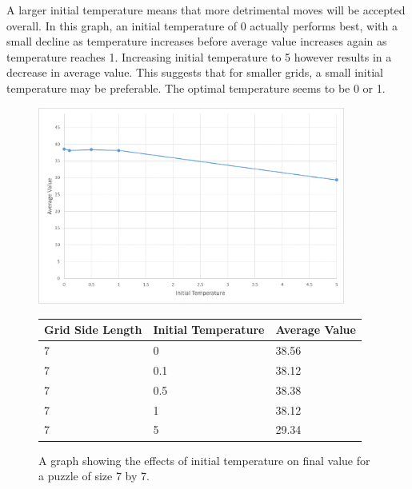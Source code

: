 \documentclass[12pt]{article}
\begin{document}
A larger initial temperature means that more detrimental moves will be accepted overall. In this graph, an initial temperature of 0 actually performs best, with a small decline as temperature increases before average value increases again as temperature reaches 1. Increasing initial temperature to 5 however results in a decrease in average value. This suggests that for smaller grids, a small initial temperature may be preferable. The optimal temperature seems to be 0 or 1.

\begin{figure}[H]
    \centering
    \includegraphics[width=0.9\textwidth]{simulated_annealing_7x7_temperature_excel}
\begin{tabular}{ |p{4cm}||p{4cm}|p{4cm}|  }
 \hline
Grid Side Length& Initial Temperature &Average Value\\
 \hline
7&0&38.56\\
7&0.1&38.12\\
7&0.5&38.38\\
7&1&38.12\\
7&5&29.34\\
 \hline
\end{tabular}
    \caption{A graph showing the effects of initial temperature on final value for a puzzle of size 7 by 7.}
    \label{fig:simulated_annealing_7x7_temperature}
\end{figure}
\end{document}
